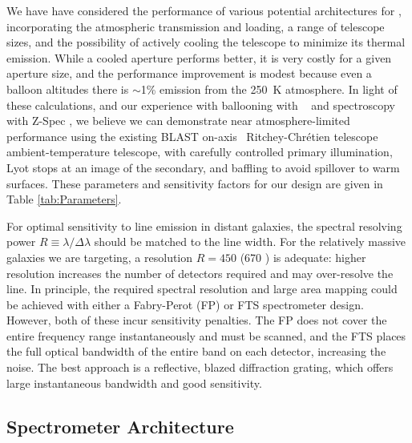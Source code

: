 We have have considered the performance of various potential
architectures for \name, incorporating the atmospheric transmission
and loading, a range of telescope sizes, and the possibility of
actively cooling the telescope to minimize its thermal emission.
While a cooled aperture performs better, it is very costly for a given
aperture size, and the performance improvement is modest because even
a balloon altitudes there is $\sim$1\% emission from the 250~K
atmosphere.  In light of these calculations, and our experience with
ballooning with \blast\  and spectroscopy
with Z-Spec , we believe we can demonstrate near atmosphere-limited performance using the existing BLAST on-axis \D\ Ritchey-Chr\'{e}tien telescope
ambient-temperature telescope, with
carefully controlled primary illumination, Lyot stops at an image of the secondary, and baffling to avoid spillover to warm surfaces.
These parameters and sensitivity factors for our design are given in
Table \ref{tab:Parameters}.

For optimal sensitivity to line emission in distant galaxies, the
spectral resolving power $R \equiv \lambda/\Delta \lambda$ should be
matched to the line width. 
For the relatively massive galaxies we are targeting, a resolution $R = 450$ (670 \kms) is adequate: higher resolution increases the number of detectors required and may over-resolve the line.
In principle, the required spectral resolution and large area mapping
could be achieved with either a Fabry-Perot (FP) or FTS spectrometer
design. However, both of these 
incur sensitivity penalties.
The FP does not cover the entire frequency range instantaneously and
must be scanned, and the FTS places the full optical bandwidth of the
entire band on each detector, increasing the noise. The best approach
is a reflective, blazed diffraction grating, which offers large
instantaneous bandwidth and good sensitivity.

\subsection{Spectrometer Architecture} 
\label{sec:Spectrometer} 

